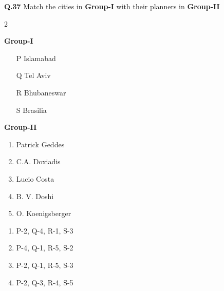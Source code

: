 \documentclass[journal,12pt,onecolumn]{IEEEtran}
\theoremstyle{remark}
\begin{document}
\noindent\textbf{Q.37} Match the cities in \textbf{Group-I} with their planners in \textbf{Group-II}
\begin{multicols} {2}
    
\hspace{1cm} \textbf{Group-I}
\begin{enumerate}[label= (\Alph*) ,leftmargin=1.5cm]
    \item [P] \hspace{0.2cm} Islamabad
    \item [Q] \hspace{0.2cm} Tel Aviv
    \item [R] \hspace{0.2cm} Bhubaneswar
    \item [S] \hspace{0.2cm} Brasilia
\end{enumerate}
\columnbreak
\noindent \hspace{1cm} \textbf{Group-II}
\begin{enumerate}
    \item Patrick Geddes
    \item C.A. Doxiadis
    \item Lucio Costa
    \item B. V. Doshi
    \item O. Koenigsberger
\end{enumerate}
\end{multicols}
\begin{multicols}{2}
\begin{enumerate}[label=(\Alph*),leftmargin=1.5cm]
    \item P-2, Q-4, R-1, S-3
    \item P-4, Q-1, R-5, S-2
    \item P-2, Q-1, R-5, S-3
    \item P-2, Q-3, R-4, S-5
\end{enumerate}
\end{multicols}

\vspace{0.1cm}
\end{document}
